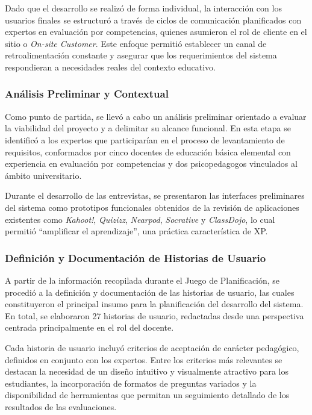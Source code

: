 Dado que el desarrollo se realizó de forma individual, la interacción con los usuarios finales se estructuró a través de ciclos de comunicación planificados con expertos en evaluación por competencias, quienes asumieron el rol de cliente en el sitio o \textit{On-site Customer}. Este enfoque permitió establecer un canal de retroalimentación constante y asegurar que los requerimientos del sistema respondieran a necesidades reales del contexto educativo.

\subsubsection*{Análisis Preliminar y Contextual}

Como punto de partida, se llevó a cabo un análisis preliminar orientado a evaluar la viabilidad del proyecto y a delimitar su alcance funcional. En esta etapa se identificó a los expertos que participarían en el proceso de levantamiento de requisitos, conformados por cinco docentes de educación básica elemental con experiencia en evaluación por competencias y dos psicopedagogos vinculados al ámbito universitario.

Durante el desarrollo de las entrevistas, se presentaron las interfaces preliminares del sistema como prototipos funcionales obtenidos de la revisión de aplicaciones existentes como \textit{Kahoot!}, \textit{Quizizz}, \textit{Nearpod}, \textit{Socrative} y \textit{ClassDojo}, lo cual permitió ``amplificar el aprendizaje'', una práctica característica de XP.

\subsubsection*{Definición y Documentación de Historias de Usuario}

A partir de la información recopilada durante el Juego de Planificación, se procedió a la definición y documentación de las historias de usuario, las cuales constituyeron el principal insumo para la planificación del desarrollo del sistema. En total, se elaboraron 27 historias de usuario, redactadas desde una perspectiva centrada principalmente en el rol del docente.

Cada historia de usuario incluyó criterios de aceptación de carácter pedagógico, definidos en conjunto con los expertos. Entre los criterios más relevantes se destacan la necesidad de un diseño intuitivo y visualmente atractivo para los estudiantes, la incorporación de formatos de preguntas variados y la disponibilidad de herramientas que permitan un seguimiento detallado de los resultados de las evaluaciones.

